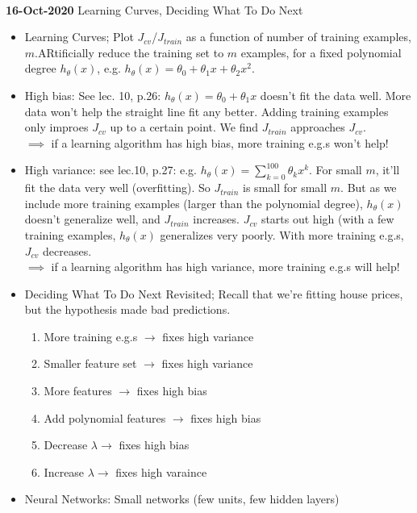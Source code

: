 \documentclass[10pt]{article}
\begin{document}
\hfill \\
{\large \textbf{16-Oct-2020} Learning Curves, Deciding What To Do Next}
\begin{itemize}
  \item Learning Curves; Plot $J_{cv}$/$J_{train}$ as a function of number of training
    examples, $m$.ARtificially reduce the training set to $m$
    examples, for a fixed polynomial degree $h_{\theta}(x)$,
    e.g. $h_{\theta}(x) = \theta_0 + \theta_1x + \theta_2x^2$.
  \item High bias: See lec. 10, p.26:
    $h_{\theta}(x)=\theta_0+\theta_1x$ doesn't fit the data well. More
    data won't help the straight line fit any better. Adding training
    examples only improes $J_{cv}$ up to a certain point. We find $J_{train}$ approaches $J_{cv}$.\\
    $\implies$ if a learning algorithm has high bias, more training e.g.s won't help!
  \item High variance: see lec.10, p.27: e.g. $h_{\theta}(x) =
    \sum_{k=0}^{100}\theta_k x^k$. For small $m$, it'll fit the data
    very well (overfitting). So $J_{train}$ is small for small
    $m$. But as we include more training examples (larger than the
    polynomial degree), $h_{\theta}(x)$ doesn't generalize well, and
    $J_{train}$ increases. $J_{cv}$ starts out high (with a few
    training examples, $h_{\theta}(x)$ generalizes very poorly. With
    more training e.g.s, $J_{cv}$ decreases. \\
    $\implies$ if a learning algorithm has high variance, more training e.g.s will help!
  \item Deciding What To Do Next Revisited; Recall that we're fitting house prices, but the hypothesis made bad predictions.
    \begin{enumerate}
      \item More training e.g.s $\rightarrow$ fixes high variance
      \item Smaller feature set $\rightarrow$ fixes high variance
      \item More features $\rightarrow$ fixes high bias
      \item Add polynomial features $\rightarrow$ fixes high bias
      \item Decrease $\lambda \rightarrow$ fixes high bias
      \item Increase $\lambda \rightarrow$ fixes high varaince
    \end{enumerate}
  \item Neural Networks: Small networks (few units, few hidden layers)

\end{itemize}
\end{document}
